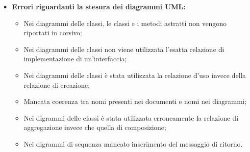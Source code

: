 \begin{itemize}
\begin{itemize}
	\end{itemize}
\item \textbf{Errori riguardanti la stesura dei diagrammi UML:}
	\begin{itemize}
	\item Nei diagrammi delle classi, le classi e i metodi astratti non vengono riportati in corsivo;
	\item Nei diagrammi delle classi non viene utilizzata l'esatta relazione di implementazione di un'interfaccia;
	\item Nei diagrammi delle classi è stata utilizzata la relazione d'uso invece della relazione di creazione;
	\item Mancata coerenza tra nomi presenti nei documenti e nomi nei diagrammi;
	\item Nei digrammi delle classi è stata utilizzata erroneamente la relazione di aggregazione invece che quella di composizione;
	\item Nei digrammi di sequenza mancato inserimento del messaggio di ritorno.
	\end{itemize}
\end{itemize}
